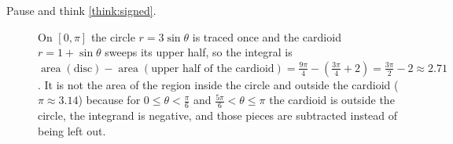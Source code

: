 \documentclass[11pt]{article}
\begin{document}
\begin{description}
  \item[Pause and think \ref{think:signed}.] On $[0,\pi]$ the circle $r=3\sin\theta$ is traced once and the cardioid $r=1+\sin\theta$ sweeps its upper half, so the integral is $\operatorname{area}(\text{disc})-\operatorname{area}(\text{upper half of the cardioid})=\frac{9\pi}4-\left(\frac{3\pi}4+2\right)=\frac{3\pi}2-2\approx2.71$. It is not the area of the region inside the circle and outside the cardioid ($\pi\approx3.14$) because for $0\le\theta<\frac\pi6$ and $\frac{5\pi}6<\theta\le\pi$ the cardioid is outside the circle, the integrand is negative, and those pieces are subtracted instead of being left out.
\end{description}
\end{document}
